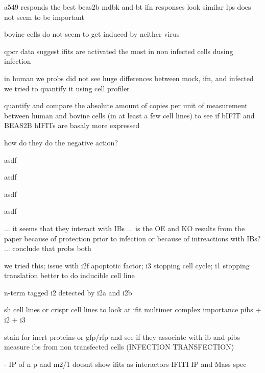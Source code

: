a549 responds the best
beas2b mdbk and bt ifn responses look similar
lps does not seem to be important

bovine cells do not seem to get induced by neither virus


qpcr data suggest ifits are activated the most in non infected cells dusing infection

in human we probs did not see huge differences between mock, ifn, and infected
we tried to quantify it using cell profiler \cite{McQuin2018CellProfilerBiology}

quantify and compare the absolute amount of copies per unit of measurement between human and bovine cells (in at least a few cell lines) to see if bIFIT and BEAS2B hIFITs are basaly more expressed

how do they do the negative action?

asdf

asdf

asdf

asdf


... it seems that they interact with IBs ... is the OE and KO results from the paper because of protection prior to infection or because of intreactions with IBs? ... conclude that probs both



we tried this; issue with i2f apoptotic factor; i3 stopping cell cycle; i1 stopping translation
better to do inducible cell line

n-term tagged i2 detected by i2a and i2b

sh cell lines or crispr cell lines to look at ifit multimer complex importance
pibs + i2 + i3

stain for inert proteins or gfp/rfp and see if they associate with ib and pibs
measure ibs from non transfected cells (INFECTION TRANSFECTION)

\cite{Oliveira2013HumanCells} - IP of n p and m2/1 doesnt show ifits as interactors
IFITI IP and Mass spec

